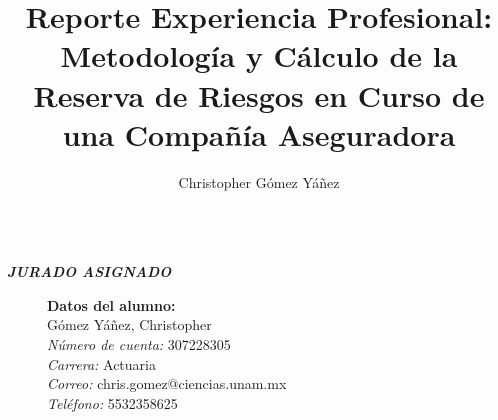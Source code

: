\documentclass[11pt,twoside,openright,spanish]{report}
\numberwithin{equation}{chapter}
\numberwithin{figure}{chapter}
\numberwithin{table}{chapter}
\renewcommand{\baselinestretch}{2}
\newenvironment{changemargin}[3]{
	\begin{list}{}{
			\setlength{\topsep}{#3}
			\setlength{\leftmargin}{#1}
			\setlength{\rightmargin}{#2}
			\setlength{\listparindent}{\parindent}
			\setlength{\itemindent}{\parindent}
			\setlength{\parsep}{\parskip}
		}
		\item[]}{\end{list}}
\begin{document}
	
	\renewcommand{\baselinestretch}{1}
	
	\graphicspath{{./Imagenes/}}
	
	\title{Reporte Experiencia Profesional: Metodología y Cálculo de la Reserva de Riesgos en Curso de una Compañía Aseguradora}
	\author{Christopher Gómez Yáñez}
	\maketitle
	
	\newpage
	$\ $
	\thispagestyle{empty} %
	
	\begin{changemargin}{1cm}{0cm}{1cm}
		
		\vspace{30cm} 
		\begin{center}
			\textit{\textbf{\Large JURADO ASIGNADO}}
		\end{center}
		\vspace{1cm}
		 
		\begin{description}
			\item[]\textbf{Datos del alumno:}\\
			Gómez Yáñez, Christopher\\
			\textit{Número de cuenta:} 307228305\\
			\textit{Carrera:} Actuaria\\
			\textit{Correo:} chris.gomez@ciencias.unam.mx\\
			\textit{Teléfono:} 5532358625
			

\end{description}
\end{changemargin}
\end{document}
